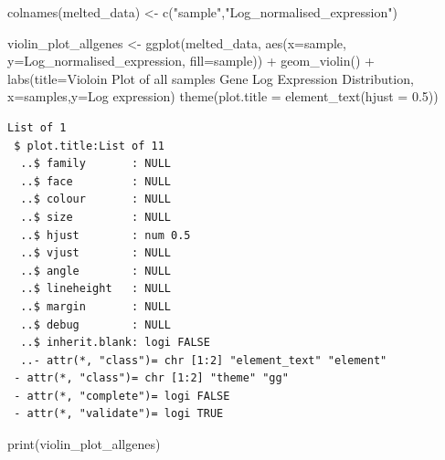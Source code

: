 \documentclass[
  letterpaper,
  DIV=11,
  numbers=noendperiod]{scrartcl}
\newenvironment{Shaded}{\begin{snugshade}}{\end{snugshade}}
\newcommand{\AttributeTok}[1]{\textcolor[rgb]{0.40,0.45,0.13}{#1}}
\newcommand{\FloatTok}[1]{\textcolor[rgb]{0.68,0.00,0.00}{#1}}
\newcommand{\FunctionTok}[1]{\textcolor[rgb]{0.28,0.35,0.67}{#1}}
\newcommand{\NormalTok}[1]{\textcolor[rgb]{0.00,0.23,0.31}{#1}}
\newcommand{\OtherTok}[1]{\textcolor[rgb]{0.00,0.23,0.31}{#1}}
\newcommand{\SpecialCharTok}[1]{\textcolor[rgb]{0.37,0.37,0.37}{#1}}
\newcommand{\StringTok}[1]{\textcolor[rgb]{0.13,0.47,0.30}{#1}}
\begin{document}
\begin{Shaded}
\begin{Highlighting}[]
\FunctionTok{colnames}\NormalTok{(melted\_data) }\OtherTok{\textless{}{-}} \FunctionTok{c}\NormalTok{(}\StringTok{"sample"}\NormalTok{,}\StringTok{"Log\_normalised\_expression"}\NormalTok{)}

\NormalTok{violin\_plot\_allgenes }\OtherTok{\textless{}{-}} \FunctionTok{ggplot}\NormalTok{(melted\_data, }\FunctionTok{aes}\NormalTok{(}\AttributeTok{x=}\NormalTok{sample, }\AttributeTok{y=}\NormalTok{Log\_normalised\_expression, }\AttributeTok{fill=}\NormalTok{sample)) }\SpecialCharTok{+}
  \FunctionTok{geom\_violin}\NormalTok{() }\SpecialCharTok{+}
  \FunctionTok{labs}\NormalTok{(}\AttributeTok{title=}\StringTok{\textquotesingle{}Violoin Plot of all samples Gene Log Expression Distribution\textquotesingle{}}\NormalTok{, }\AttributeTok{x=}\StringTok{\textquotesingle{}samples\textquotesingle{}}\NormalTok{,}\AttributeTok{y=}\StringTok{\textquotesingle{}Log expression\textquotesingle{}}\NormalTok{)}
  \FunctionTok{theme}\NormalTok{(}\AttributeTok{plot.title =} \FunctionTok{element\_text}\NormalTok{(}\AttributeTok{hjust =} \FloatTok{0.5}\NormalTok{))}
\end{Highlighting}
\end{Shaded}

\begin{verbatim}
List of 1
 $ plot.title:List of 11
  ..$ family       : NULL
  ..$ face         : NULL
  ..$ colour       : NULL
  ..$ size         : NULL
  ..$ hjust        : num 0.5
  ..$ vjust        : NULL
  ..$ angle        : NULL
  ..$ lineheight   : NULL
  ..$ margin       : NULL
  ..$ debug        : NULL
  ..$ inherit.blank: logi FALSE
  ..- attr(*, "class")= chr [1:2] "element_text" "element"
 - attr(*, "class")= chr [1:2] "theme" "gg"
 - attr(*, "complete")= logi FALSE
 - attr(*, "validate")= logi TRUE
\end{verbatim}

\begin{Shaded}
\begin{Highlighting}[]
\FunctionTok{print}\NormalTok{(violin\_plot\_allgenes)}
\end{Highlighting}
\end{Shaded}
\end{document}
